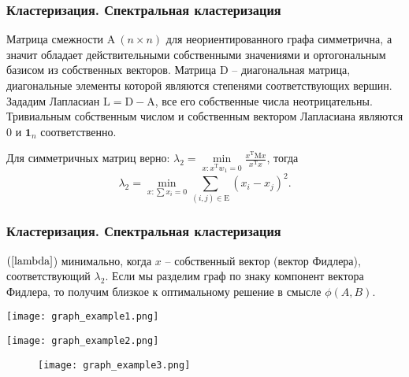 \documentclass[notheorems, handout]{beamer}
\begin{document}
	\begin{frame}
	\frametitle{Кластеризация. Спектральная кластеризация}
	Матрица смежности $\mathrm{A}\ (n\times n)$ для неориентированного графа симметрична, а значит обладает действительными собственными значениями и ортогональным базисом из собственных векторов. Матрица $\mathrm{D}$ -- диагональная матрица, диагональные элементы которой являются степенями соответствующих вершин. Зададим Лапласиан $\mathrm{L}=\mathrm{D}-\mathrm{A}$, все его собственные числа неотрицательны. Тривиальным собственным числом и собственным вектором Лапласиана являются 0 и $\mathbf{1}_n$ соответственно.
	
	Для симметричных матриц верно: 
	$\lambda_2=\min\limits_{x:x^{\mathrm{T}}w_1=0}\frac{x^{\mathrm{T}}\mathrm{M}x}{x^{\mathrm{T}}x}$, тогда
	\begin{equation}
	\label{lambda}
	\lambda_2=\min\limits_{x:\sum{x_i}=0}\sum\limits_{(i,j)\in\mathrm{E}}(x_i-x_j)^2.
	\end{equation}
	\end{frame}
	
	\begin{frame}
	\frametitle{Кластеризация. Спектральная кластеризация}
	$(\ref{lambda}$) минимально, когда $x$ -- собственный вектор (вектор Фидлера), соответствующий $\lambda_2$. Если мы разделим граф по знаку компонент вектора Фидлера, то получим близкое к оптимальному решение в смысле $\phi(A,B)$.
	
	\begin{minipage}{0.45\textwidth}
		\centering
		\texttt{[image: graph\_example1.png]}
	\end{minipage}\hfill
	\begin{minipage}{0.45\textwidth}
		\centering
		\texttt{[image: graph\_example2.png]}
	\end{minipage}
	\begin{figure}[H]
	\begin{center}
		\texttt{[image: graph\_example3.png]}
	\end{center}
	\end{figure}
	\end{frame}
	
\end{document}
